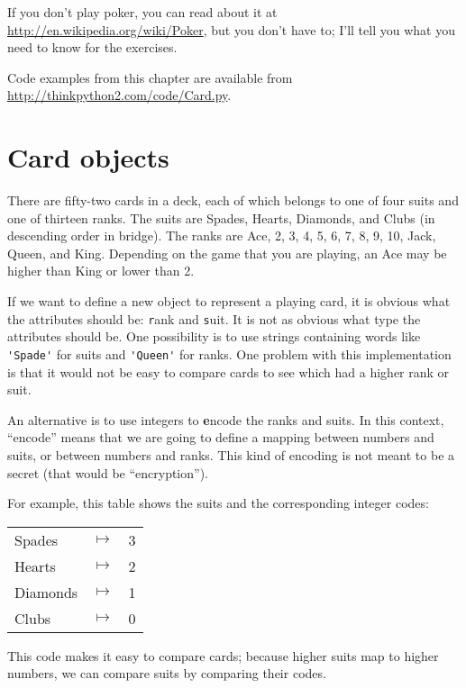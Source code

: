 \documentclass[
DIV=11,
fontsize=12,
twoside,
headinclude=false,
titlepage=firstiscover,
abstract=true,
headsepline=true,
footsepline=true,
chapterprefix=true, %
headings=big,
bibliography=totoc,%
captions=tableheading
]{scrbook}
\theoremstyle{definition}
\begin{document}
If you don't play
poker, you can read about it at
\url{http://en.wikipedia.org/wiki/Poker}, but you don't have to; I'll
tell you what you need to know for the exercises.

Code examples from
this chapter are available from
\url{http://thinkpython2.com/code/Card.py}.


\section{Card objects}

There are fifty-two cards in a deck, each of which belongs to one of
four suits and one of thirteen ranks.  The suits are Spades, Hearts,
Diamonds, and Clubs (in descending order in bridge).  The ranks are
Ace, 2, 3, 4, 5, 6, 7, 8, 9, 10, Jack, Queen, and King.  Depending on
the game that you are playing, an Ace may be higher than King
or lower than 2.

If we want to define a new object to represent a playing card, it is
obvious what the attributes should be: {\texttt rank} and
{\texttt suit}.  It is not as obvious what type the attributes
should be.  One possibility is to use strings containing words like
\verb"'Spade'" for suits and \verb"'Queen'" for ranks.  One problem with
this implementation is that it would not be easy to compare cards to
see which had a higher rank or suit.

An alternative is to use integers to {\textbf encode} the ranks and suits.
In this context, ``encode'' means that we are going to define a mapping
between numbers and suits, or between numbers and ranks.  This
kind of encoding is not meant to be a secret (that
would be ``encryption'').

\newcommand{\mymapsto}{$\mapsto$}

For example, this table shows the suits and the corresponding integer
codes:

\begin{tabular}{l c l}
Spades & \mymapsto & 3 \\
Hearts & \mymapsto & 2 \\
Diamonds & \mymapsto & 1 \\
Clubs & \mymapsto & 0
\end{tabular}

This code makes it easy to compare cards; because higher suits map to
higher numbers, we can compare suits by comparing their codes.
\end{document}
